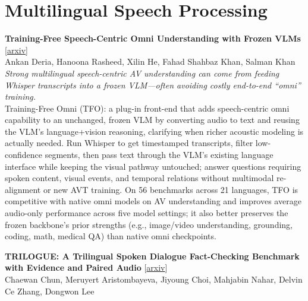\documentclass[12pt,letterpaper]{article}
\begin{document}
\medskip


\section*{Multilingual Speech Processing}

{\small\textbf{Training-Free Speech-Centric Omni Understanding with Frozen VLMs}} {\scriptsize[\href{https://arxiv.org/abs/2609.04242}{arxiv}]}\\
{\scriptsize Ankan Deria, Hanoona Rasheed, Xilin He, Fahad Shahbaz Khan, Salman Khan}\\

{\small\textit{Strong multilingual speech-centric AV understanding can come from feeding Whisper transcripts into a frozen VLM---often avoiding costly end-to-end ``omni'' training.}}\\[1pt]
{\footnotesize Training-Free Omni (TFO): a plug-in front-end that adds speech-centric omni capability to an unchanged, frozen VLM by converting audio to text and reusing the VLM's language+vision reasoning, clarifying when richer acoustic modeling is actually needed. Run Whisper to get timestamped transcripts, filter low-confidence segments, then pass text through the VLM's existing language interface while keeping the visual pathway untouched; answer questions requiring spoken content, visual events, and temporal relations without multimodal re-alignment or new AVT training. On 56 benchmarks across 21 languages, TFO is competitive with native omni models on AV understanding and improves average audio-only performance across five model settings; it also better preserves the frozen backbone's prior strengths (e.g., image/video understanding, grounding, coding, math, medical QA) than native omni checkpoints.}

\medskip

{\small\textbf{TRILOGUE: A Trilingual Spoken Dialogue Fact-Checking Benchmark with Evidence and Paired Audio}} {\scriptsize[\href{https://arxiv.org/abs/2609.04452}{arxiv}]}\\
{\scriptsize Chaewan Chun, Meruyert Aristombayeva, Jiyoung Choi, Mahjabin Nahar, Delvin Ce Zhang, Dongwon Lee}\\
\end{document}
